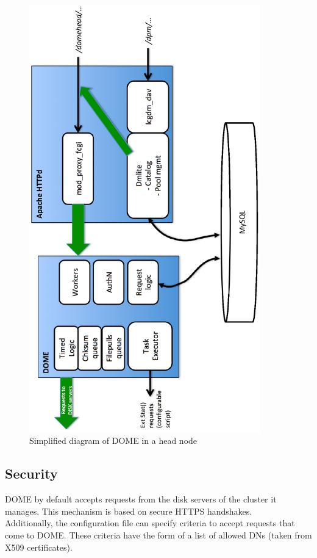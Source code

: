 \documentclass[a4paper,10pt]{scrreprt}
\begin{document}
\begin{figure}
\begin{center}
 \includegraphics[width=10cm,keepaspectratio=true,angle=-90,origin=c]{./pics/domepics_head.eps}
 \caption{Simplified diagram of DOME in a head node}
 \label{figdomehead}
\end{center}

\end{figure}

\subsection{Security}
DOME by default accepts requests from the disk servers of the cluster it manages. This mechanism is based on secure HTTPS handshakes.\\
Additionally, the configuration file can specify criteria to accept requests that come to DOME. These criteria have the form
of a list of allowed DNs (taken from X509 certificates).\\
\end{document}
